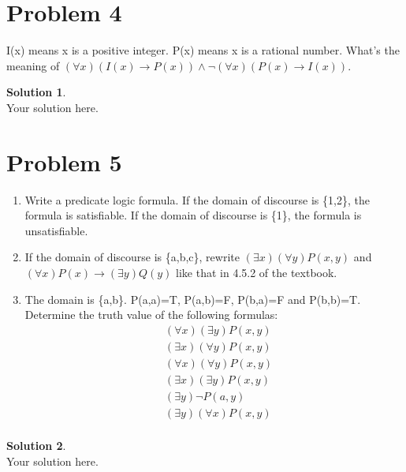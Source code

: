 \documentclass[a4paper,UTF8]{article}
\theoremstyle{definition}
\newtheorem*{solution}{Solution}
\begin{document}
\section*{Problem 4}
I(x) means x is a positive integer. P(x) means x is a rational number. What's the meaning of $ (\forall x)( I(x)\rightarrow P(x) )\wedge\neg(\forall x)( P(x)\rightarrow I(x) ) $.
\begin{solution}
~\\
Your solution here.
\end{solution}

\section*{Problem 5}
\begin{enumerate}
\item Write a predicate logic formula. If the domain of discourse is \{1,2\}, the formula is satisfiable. If the domain of discourse is \{1\}, the formula is unsatisfiable.
\item If the domain of discourse is \{a,b,c\}, rewrite $(\exists x)(\forall y)P(x,y)$ and $(\forall x)P(x)\rightarrow (\exists y)Q(y)$ like that in 4.5.2 of the textbook.
\item The domain is \{a,b\}. P(a,a)=T, P(a,b)=F, P(b,a)=F and P(b,b)=T. Determine the truth value of the following formulas:
\begin{align*}
&(\forall x)(\exists y)P(x,y)\\
&(\exists x)(\forall y)P(x,y)\\
&(\forall x)(\forall y)P(x,y)\\
&(\exists x)(\exists y)P(x,y)\\
&(\exists y)\neg P(a,y)\\
&(\exists y)(\forall x)P(x,y)\\
\end{align*}
\end{enumerate}

\begin{solution}
~\\
Your solution here.
\end{solution}
\end{document}
